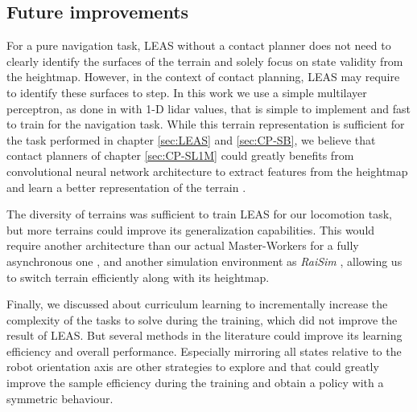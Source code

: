 \subsection{Future improvements}

For a pure navigation task, LEAS without a contact planner does not need to clearly identify the surfaces of the terrain and solely focus on state validity from the heightmap. 
However, in the context of contact planning, LEAS may require to identify these surfaces to step.
In this work we use a simple multilayer perceptron, as done in \cite{RL_RRT, RL_RRT_AUTORL} with 1-D lidar values, that is simple to implement and fast to train for the navigation task. 
While this terrain representation is sufficient for the task performed in chapter \ref{sec:LEAS} and \ref{sec:CP-SB}, we believe that contact planners of chapter \ref{sec:CP-SL1M} could greatly benefits from convolutional neural network architecture to extract features from the heightmap and learn a better representation of the terrain \cite{deepLoco,deepGait,RLOC}.

The diversity of terrains was sufficient to train LEAS for our locomotion task, but more terrains could improve its generalization capabilities. This would require another architecture than our actual Master-Workers for a fully asynchronous one \cite{impala2018, DD_PPO}, and another simulation environment as \textit{RaiSim} \cite{raisim}, allowing us to switch terrain efficiently along with its heightmap.

Finally, we discussed about curriculum learning \cite{curriculum_learning_survey} to incrementally increase the complexity of the tasks to solve during the training, which did not improve the result of LEAS. But several methods in the literature could improve its learning efficiency and overall performance.
Especially mirroring all states relative to the robot orientation axis are other strategies to explore and that could greatly improve the sample efficiency during the training and obtain a policy with a symmetric behaviour.



